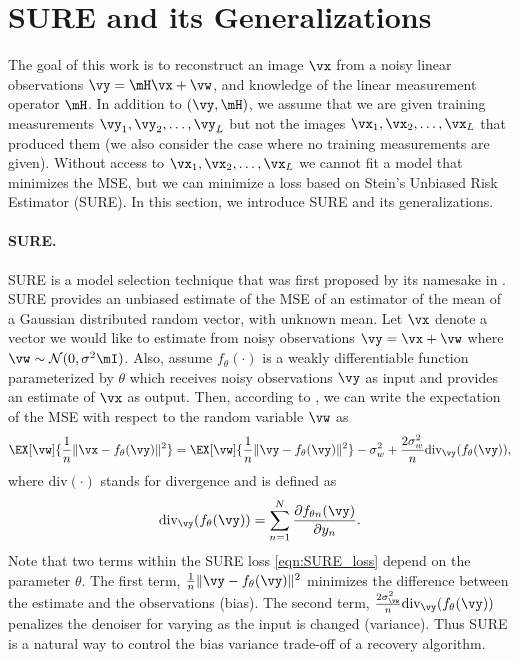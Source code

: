 \documentclass{article}
\newcommand\img{\vx}
\newcommand\obs{\vy}
\newcommand\noise{\vw}
\begin{document}
\section{SURE and its Generalizations}\label{sec:SURE}

The goal of this work is to reconstruct an image $\img$ from a noisy linear observations $\obs = \mH \img + \noise$, and knowledge of the linear measurement operator $\mH$. In addition to $(\obs,\mH)$, we assume that we are given training measurements $\obs_1,\obs_2,\ldots,\obs_L$ but not the images $\img_1,\img_2,\ldots,\img_L$ that produced them (we also consider the case where no training measurements are given). 
Without access to $\img_1,\img_2,\ldots,\img_L$ we cannot fit a model that minimizes the MSE, but we can minimize a loss based on Stein's Unbiased Risk Estimator (SURE).
In this section, we introduce SURE and its generalizations.

\paragraph{SURE.}  SURE is a model selection technique that was first proposed by its namesake in \cite{SURE}. SURE provides an unbiased
estimate of the MSE of an estimator of the mean of a Gaussian distributed random vector, with unknown mean. 
Let $\vx$ denote a vector we would like to estimate from noisy observations $\vy=\vx+\vw$ where $\vw\sim \mathcal{N}(0,\sigma^2 \mI)$. Also, assume $f_\theta(\cdot)$ is a weakly differentiable function parameterized by $\theta$ which receives noisy observations $\vy$ as input and provides an estimate of $\vx$ as output. Then, according to \cite{SURE}, we can write the expectation of the MSE with respect to the random variable $\noise$ as
\begin{align}\label{eqn:SURE_loss}
    \EX[\vw]{ \frac{1}{n}\|\vx-f_\theta(\vy)\|^2}
    =
    \EX[\vw]{ \frac{1}{n}\|\vy-f_\theta (\vy)\|^2}
    -\sigma_w^2
    +\frac{2\sigma_w^2}{n}\text{div}_\vy(f_\theta (\vy)),
\end{align}
where $\text{div}(\cdot)$ stands for divergence and is defined as
\begin{align}
    \text{div}_\vy(f_\theta (\vy))=\sum_{n=1}^N \frac{\partial f_{\theta n}(\vy)}{\partial y_n}.
\end{align}Note that two terms within the SURE loss \eqref{eqn:SURE_loss} depend on the parameter $\theta$. The first term,  $\frac{1}{n}\|\vy-f_\theta (\vy)\|^2$ minimizes the difference between the estimate and the observations (bias). The second term, $\frac{2\sigma_\vw^2}{n}\text{div}_\vy(f_\theta (\vy))$ penalizes the denoiser for varying as the input is changed (variance). Thus SURE is a natural way to control the bias variance trade-off of a recovery algorithm.
\end{document}
